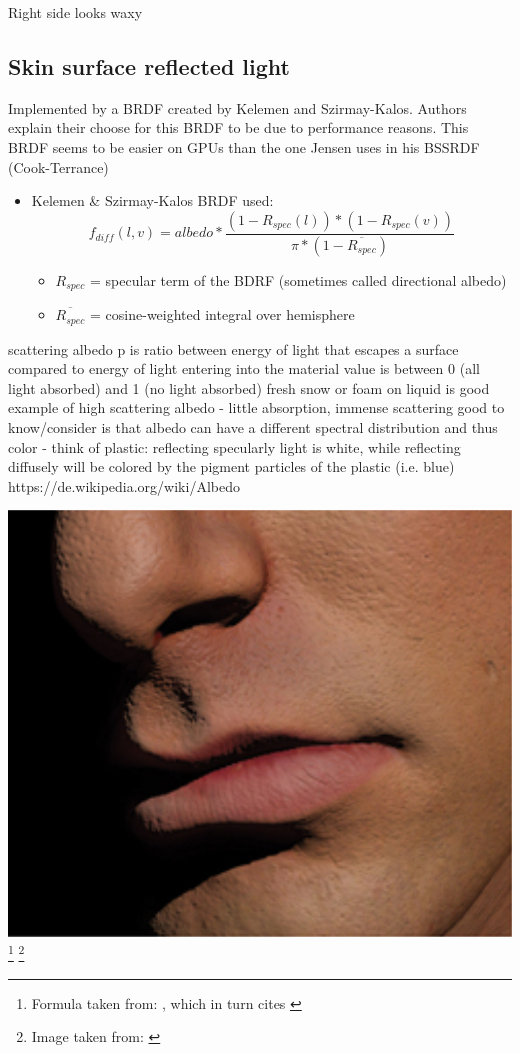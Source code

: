 \documentclass[ngerman,runningheads,a4paper]{llncs}[2018/03/10]
\begin{document}
Right side looks waxy

\subsection{Skin surface reflected light}
\label{sub:skin-surface-reflect}

Implemented by a BRDF created by Kelemen and Szirmay-Kalos.
Authors explain their choose for this BRDF to be due to performance reasons.
This BRDF seems to be easier on GPUs than the one Jensen uses in his BSSRDF (Cook-Terrance)

\begin{itemize}
  \item Kelemen \& Szirmay-Kalos BRDF used: $$f_{diff}(l, v) = albedo * \frac{(1 - R_{spec}(l))* (1 - R_{spec}(v))}{\pi * (1 - \overline{R_{spec}})}$$
  \begin{itemize}
    \item $R_{spec}$ = specular term of the BDRF (sometimes called directional albedo)
    \item $\overline{R_{spec}}$ = cosine-weighted integral over hemisphere
  \end{itemize}
\end{itemize}

scattering albedo p is ratio between energy of light that escapes a surface compared to energy of light entering into the material
value is between 0 (all light absorbed) and 1 (no light absorbed)
fresh snow or foam on liquid is good example of high scattering albedo - little absorption, immense scattering
good to know/consider is that albedo can have a different spectral distribution and thus color - think of plastic: reflecting specularly light is white, while reflecting diffusely will be colored by the pigment particles of the plastic (i.e. blue)
https://de.wikipedia.org/wiki/Albedo

\includegraphics[scale=0.2,keepaspectratio]{./images/skin-rendering-without-sss.jpg}
\footnote{Formula taken from: \cite[p.~352]{real-time-rendering}, which in turn cites \cite{kelemen2001microfacet}}
\footnote{Image taken from: \citet{efficient-human-skin-rendering}}
\end{document}
